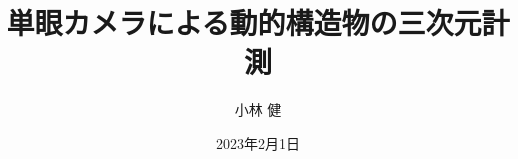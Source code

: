 \documentclass{jsarticle} %
\title{単眼カメラによる動的構造物の三次元計測}
\date{2023年2月1日}
\author{小林 健}
\newenvironment{heightchange}{%
	\setlength{\textheight}{680pt}
}%
\begin{document}
\maketitle
\thispagestyle{empty}%
\newpage

\thispagestyle{empty}%

\newpage

\pagestyle{fancy}
\rhead{}%
\lhead{\rightmark}%

\tableofcontents
\newpage

\listoffigures
\newpage

\listoftables
\newpage

\pagestyle{fancy}
\rhead{\rightmark}%
\lhead{\leftmark}%

 {chapter1}
\clearpage

 {chapter2}
\clearpage

 {chapter3}
\clearpage

 {chapter4}
\clearpage

 {chapter5}
\clearpage

\pagestyle{fancy}
\rhead{}%
\lhead{\rightmark}%
\clearpage

\begin{heightchange}
	\newpage
	\thispagestyle{empty}%
	
\end{heightchange}
\end{document}
